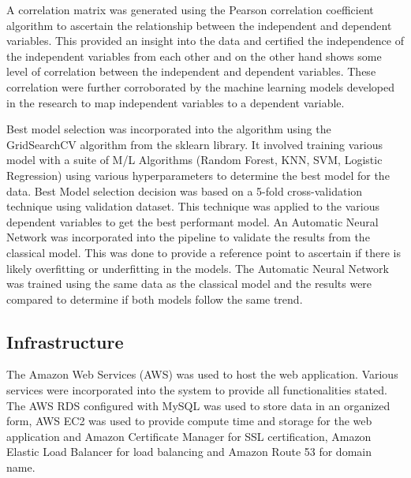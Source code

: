 A correlation matrix was generated using the Pearson correlation coefficient algorithm to ascertain the relationship between the independent and dependent 
variables. This provided an insight into the data and certified the independence of the independent variables from each other and on the other hand shows
some level of correlation between the independent and dependent variables. These correlation were further corroborated by the machine learning models 
developed in the research to map independent variables to a dependent variable.

Best model selection was incorporated into the algorithm using the GridSearchCV algorithm from the sklearn library. It involved training various model with
a suite of M/L Algorithms (Random Forest, KNN, SVM, Logistic Regression) using various hyperparameters to determine the best model for the data. Best Model
selection decision was based on a 5-fold cross-validation technique using validation dataset. This technique was applied to the various dependent variables
to get the best performant model. An Automatic Neural Network was incorporated into the pipeline to validate the results from the classical model. This 
was done to provide a reference point to ascertain if there is likely overfitting or underfitting in the models. The Automatic Neural Network was trained
using the same data as the classical model and the results were compared to determine if both models follow the same trend. 

\subsection{Infrastructure}
The Amazon Web Services (AWS) was used to host the web application. Various services were incorporated into the system to provide all functionalities
stated. The AWS RDS configured with MySQL was used to store data in an organized form, AWS EC2 was used to provide compute time and storage for the web
application and Amazon Certificate Manager for SSL certification, Amazon Elastic Load Balancer for load balancing and Amazon Route 53 for domain name. 

